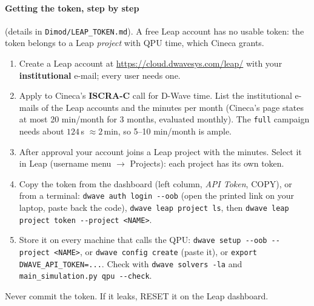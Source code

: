 \documentclass[11pt,a4paper]{article}
\newcommand{\code}[1]{\nolinkurl{#1}}
\begin{document}
\paragraph{Getting the token, step by step} (details in \code{Dimod/LEAP_TOKEN.md}). A free Leap account has
no usable token: the token belongs to a Leap \emph{project} with QPU time, which Cineca grants.
\begin{enumerate}
\item Create a Leap account at \url{https://cloud.dwavesys.com/leap/} with your \textbf{institutional} e-mail; every user needs one.
\item Apply to Cineca's \textbf{ISCRA-C} call for D-Wave time. List the institutional e-mails of the Leap accounts and the minutes per month (Cineca's page states at most 20 min/month for 3 months, evaluated monthly). The \code{full} campaign needs about $124\,$s $\approx2\,$min, so 5--10 min/month is ample.
\item After approval your account joins a Leap project with the minutes. Select it in Leap (username menu $\to$ Projects): each project has its own token.
\item Copy the token from the dashboard (left column, \emph{API Token}, COPY), or from a terminal:
\code{dwave auth login --oob} (open the printed link on your laptop, paste back the code), \code{dwave leap project ls}, then \code{dwave leap project token --project <NAME>}.
\item Store it on every machine that calls the QPU: \code{dwave setup --oob --project <NAME>}, or \code{dwave config create} (paste it), or \code{export DWAVE_API_TOKEN=...}. Check with \code{dwave solvers -la} and \code{main_simulation.py qpu --check}.
\end{enumerate}
Never commit the token. If it leaks, RESET it on the Leap dashboard.
\end{document}
